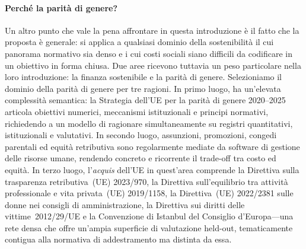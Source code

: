 \documentclass[pdflatex, sn-apa]{sn-jnl}%
\theoremstyle{thmstyleone}%
\theoremstyle{thmstyletwo}%
\theoremstyle{thmstylethree}%
\begin{document}
\paragraph{Perché la parità di genere?}
Un altro punto che vale la pena affrontare in questa introduzione è il fatto che
la proposta è generale: si applica a qualsiasi dominio della sostenibilità il cui
panorama normativo sia denso e i cui costi sociali siano difficili da codificare
in un obiettivo in forma chiusa. Due aree ricevono tuttavia un peso particolare
nella loro introduzione: la finanza sostenibile e la parità di genere.
Selezioniamo il dominio della parità di genere per tre ragioni. In primo luogo,
ha un'elevata complessità semantica: la Strategia dell'UE per la parità di genere
2020--2025~\citep{europeancommission2020strategy} articola obiettivi numerici,
meccanismi istituzionali e principi normativi, richiedendo a un modello di
ragionare simultaneamente su registri quantitativi, istituzionali e valutativi.
In secondo luogo, assunzioni, promozioni, congedi parentali ed equità
retributiva sono regolarmente mediate da software di gestione delle risorse
umane, rendendo concreto e ricorrente il trade-off tra costo ed equità. In terzo
luogo, l'\emph{acquis} dell'UE in quest'area comprende la Direttiva sulla
trasparenza retributiva~(UE) 2023/970, la Direttiva sull'equilibrio tra attività
professionale e vita privata~(UE) 2019/1158, la Direttiva~(UE) 2022/2381 sulle
donne nei consigli di amministrazione, la Direttiva sui diritti delle
vittime~2012/29/UE e la Convenzione di Istanbul del Consiglio d'Europa---una rete
densa che offre un'ampia superficie di valutazione held-out, tematicamente
contigua alla normativa di addestramento ma distinta da essa.
 
\end{document}

